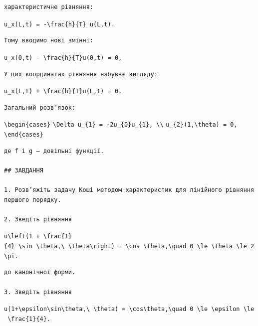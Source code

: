 \documentclass[
  ukrainian,
]{article}
\begin{document}
\begin{verbatim}
характеристичне рівняння:
\end{verbatim}

\texttt{u\_x(L,t)\ =\ -\textbackslash{}frac\{h\}\{T\}\ u(L,t).}

\begin{verbatim}
Тому вводимо нові змінні:
\end{verbatim}

\texttt{u\_x(0,t)\ -\ \textbackslash{}frac\{h\}\{T\}u(0,t)\ =\ 0,}

\begin{verbatim}
У цих координатах рівняння набуває вигляду:
\end{verbatim}

\texttt{u\_x(L,t)\ +\ \textbackslash{}frac\{h\}\{T\}u(L,t)\ =\ 0.}

\begin{verbatim}
Загальний розв’язок:
\end{verbatim}

\texttt{\textbackslash{}begin\{cases\}}
\texttt{\textbackslash{}Delta\ u\_\{1\}\ =\ -2u\_\{0\}u\_\{1\},\ \textbackslash{}\textbackslash{}}
\texttt{u\_\{2\}(1,\textbackslash{}theta)\ =\ 0,}
\texttt{\textbackslash{}end\{cases\}}

\begin{verbatim}
де f і g — довільні функції.

## ЗАВДАННЯ

1. Розв’яжіть задачу Коші методом характеристик для лінійного рівняння першого порядку.

2. Зведіть рівняння
\end{verbatim}

\texttt{u\textbackslash{}left(1\ +\ \textbackslash{}frac\{1\}\{4\}\ \textbackslash{}sin\ \textbackslash{}theta,\textbackslash{}\ \textbackslash{}theta\textbackslash{}right)\ =\ \textbackslash{}cos\ \textbackslash{}theta,\textbackslash{}quad\ 0\ \textbackslash{}le\ \textbackslash{}theta\ \textbackslash{}le\ 2\textbackslash{}pi.}

\begin{verbatim}
до канонічної форми.

3. Зведіть рівняння
\end{verbatim}

\texttt{u(1+\textbackslash{}epsilon\textbackslash{}sin\textbackslash{}theta,\textbackslash{}\ \textbackslash{}theta)\ =\ \textbackslash{}cos\textbackslash{}theta,\textbackslash{}quad\ 0\ \textbackslash{}le\ \textbackslash{}epsilon\ \textbackslash{}le\ \textbackslash{}frac\{1\}\{4\}.}
\end{document}
